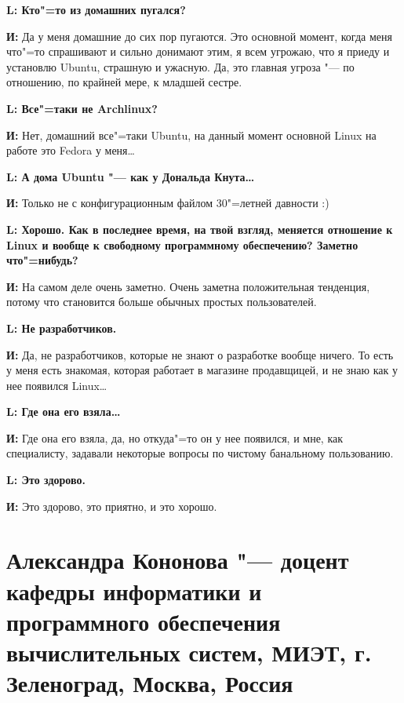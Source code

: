 \documentclass[10pt, a5paper]{article}
\begin{document}
{\noindent \bf L: Кто"=то из домашних пугался?}

{\noindent \bf И:} Да у меня домашние до сих пор пугаются. Это основной момент, когда меня что"=то спрашивают и сильно донимают этим, я всем угрожаю, что я приеду и установлю Ubuntu, страшную и ужасную. Да, это главная угроза "--- по отношению, по крайней мере, к младшей сестре.

{\noindent \bf L: Все"=таки не Archlinux?}

{\noindent \bf И:} Нет, домашний все"=таки Ubuntu, на данный момент основной Linux на работе это Fedora у меня\ldots

{\noindent \bf L: А дома Ubuntu "--- как у Дональда Кнута\ldots}

{\noindent \bf И:} Только не с конфигурационным файлом 30"=летней давности :)

{\noindent \bf L: Хорошо. Как в последнее время, на твой взгляд, меняется отношение к Linux и вообще к свободному программному обеспечению? Заметно что"=нибудь?}

{\noindent \bf И:} На самом деле очень заметно. Очень заметна положительная тенденция, потому что становится больше обычных простых пользователей.

{\noindent \bf L: Не разработчиков.}

{\noindent \bf И:} Да, не разработчиков, которые не знают о разработке вообще ничего. То есть у меня есть знакомая, которая работает в магазине продавщицей, и не знаю как у нее появился Linux\ldots

{\noindent \bf L: Где она его взяла\ldots}

{\noindent \bf И:} Где она его взяла, да, но откуда"=то он у нее появился, и мне, как специалисту, задавали некоторые вопросы по чистому банальному пользованию.

{\noindent \bf L: Это здорово.}

{\noindent \bf И:} Это здорово, это приятно, и это хорошо.

\section{Александра Кононова "--- доцент кафедры информатики и программного обеспечения вычислительных систем, МИЭТ, г. Зеленоград, Москва, Россия}

\end{document}
